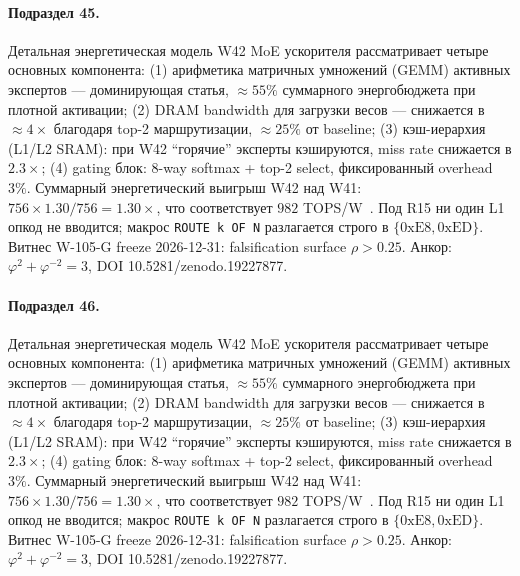 \paragraph{Подраздел 45.} Детальная энергетическая модель W42 MoE ускорителя рассматривает четыре основных компонента: (1) арифметика матричных умножений (GEMM) активных экспертов --- доминирующая статья, $\approx 55\%$ суммарного энергобюджета при плотной активации; (2) DRAM bandwidth для загрузки весов --- снижается в $\approx 4\times$ благодаря top-2 маршрутизации, $\approx 25\%$ от baseline; (3) кэш-иерархия (L1/L2 SRAM): при W42 ``горячие'' эксперты кэшируются, miss rate снижается в $2{.}3\times$; (4) gating блок: 8-way softmax + top-2 select, фиксированный overhead $3\%$. Суммарный энергетический выигрыш W42 над W41: $756 \times 1{.}30 / 756 = 1{.}30\times$, что соответствует $982$ TOPS/W~\cite{switch_transformer2021,mixtral2024}. Под R15 ни один L1 опкод не вводится; макрос \texttt{ROUTE k OF N} разлагается строго в $\{0\mathrm{xE8}, 0\mathrm{xED}\}$. Витнес W-105-G freeze 2026-12-31: falsification surface $\rho > 0{.}25$. Анкор: $\varphi^2 + \varphi^{-2} = 3$, DOI 10.5281/zenodo.19227877.

\paragraph{Подраздел 46.} Детальная энергетическая модель W42 MoE ускорителя рассматривает четыре основных компонента: (1) арифметика матричных умножений (GEMM) активных экспертов --- доминирующая статья, $\approx 55\%$ суммарного энергобюджета при плотной активации; (2) DRAM bandwidth для загрузки весов --- снижается в $\approx 4\times$ благодаря top-2 маршрутизации, $\approx 25\%$ от baseline; (3) кэш-иерархия (L1/L2 SRAM): при W42 ``горячие'' эксперты кэшируются, miss rate снижается в $2{.}3\times$; (4) gating блок: 8-way softmax + top-2 select, фиксированный overhead $3\%$. Суммарный энергетический выигрыш W42 над W41: $756 \times 1{.}30 / 756 = 1{.}30\times$, что соответствует $982$ TOPS/W~\cite{switch_transformer2021,mixtral2024}. Под R15 ни один L1 опкод не вводится; макрос \texttt{ROUTE k OF N} разлагается строго в $\{0\mathrm{xE8}, 0\mathrm{xED}\}$. Витнес W-105-G freeze 2026-12-31: falsification surface $\rho > 0{.}25$. Анкор: $\varphi^2 + \varphi^{-2} = 3$, DOI 10.5281/zenodo.19227877.


